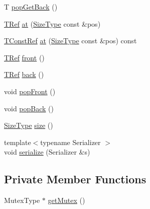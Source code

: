 \begin{DoxyCompactItemize}
\item 
T \hyperlink{structvt_1_1util_1_1container_1_1_concurrent_deque_locked_ad1905f8a1dc68a73ecda8bd2c332440e}{pop\+Get\+Back} ()
\item 
\hyperlink{structvt_1_1util_1_1container_1_1_concurrent_deque_locked_a4451b0e7f6c8aa741f98a77a9fed353e}{T\+Ref} \hyperlink{structvt_1_1util_1_1container_1_1_concurrent_deque_locked_a0999ea4ff06ed38095d31ed9710e7525}{at} (\hyperlink{structvt_1_1util_1_1container_1_1_concurrent_deque_locked_a6f35f4923f1329d25378656b0582e916}{Size\+Type} const \&pos)
\item 
\hyperlink{structvt_1_1util_1_1container_1_1_concurrent_deque_locked_a9da9776dff836c013a95431f3ab15e35}{T\+Const\+Ref} \hyperlink{structvt_1_1util_1_1container_1_1_concurrent_deque_locked_a5c5a48c3f01f61faa7329c2cbfd92103}{at} (\hyperlink{structvt_1_1util_1_1container_1_1_concurrent_deque_locked_a6f35f4923f1329d25378656b0582e916}{Size\+Type} const \&pos) const
\item 
\hyperlink{structvt_1_1util_1_1container_1_1_concurrent_deque_locked_a4451b0e7f6c8aa741f98a77a9fed353e}{T\+Ref} \hyperlink{structvt_1_1util_1_1container_1_1_concurrent_deque_locked_a036bb79b4122e2d79f62c61a7715f374}{front} ()
\item 
\hyperlink{structvt_1_1util_1_1container_1_1_concurrent_deque_locked_a4451b0e7f6c8aa741f98a77a9fed353e}{T\+Ref} \hyperlink{structvt_1_1util_1_1container_1_1_concurrent_deque_locked_ad38ab2b6cb582a65107ef74bcf678f09}{back} ()
\item 
void \hyperlink{structvt_1_1util_1_1container_1_1_concurrent_deque_locked_a24d80e8f7e30a18175f390e79f061a99}{pop\+Front} ()
\item 
void \hyperlink{structvt_1_1util_1_1container_1_1_concurrent_deque_locked_af5c7291d01a60ba4ea5e773de4c2b8e3}{pop\+Back} ()
\item 
\hyperlink{structvt_1_1util_1_1container_1_1_concurrent_deque_locked_a6f35f4923f1329d25378656b0582e916}{Size\+Type} \hyperlink{structvt_1_1util_1_1container_1_1_concurrent_deque_locked_abf19557ef8b6483fd821f7c7fd184153}{size} ()
\item 
{\footnotesize template$<$typename Serializer $>$ }\\void \hyperlink{structvt_1_1util_1_1container_1_1_concurrent_deque_locked_ae3ae8e15fea25fab5f96d3e388aa46d5}{serialize} (Serializer \&s)
\end{DoxyCompactItemize}
\subsection*{Private Member Functions}
\begin{DoxyCompactItemize}
\item 
Mutex\+Type $\ast$ \hyperlink{structvt_1_1util_1_1container_1_1_concurrent_deque_locked_ab9f6f815492221e1e159f310276b9e0b}{get\+Mutex} ()
\end{DoxyCompactItemize}
